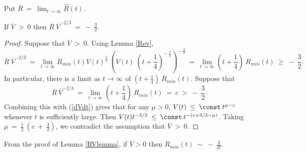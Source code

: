 Put $\overline{R} \: = \: \lim_{t \rightarrow \infty} \hat{R}(t)$.

\begin{lemma}
  \label{lem:kl-noncollapsed-pointed-limits-hyperbolic-noncollapsing-lemma-5}
 \label{RVlemma}
If $\overline{V} \: > \: 0$ then
$\overline{R} \: \overline{V}^{-2/3} \: = \: - \: \frac32$.
\end{lemma}
\begin{proof}
Suppose that $\overline{V} \: > \: 0$.
Using Lemma \ref{Rev},
\begin{equation}
\overline{R} \: \overline{V}^{-2/3}  \: = \:
\lim_{t \rightarrow \infty} R_{min}(t) V(t)^{\frac23} \:
\left( V(t) \: \left(t + \frac14 \right)^{- \: \frac32} \right)^{- \: \frac23} \: = \:
\lim_{t \rightarrow \infty} \left( t + \frac14 \right) \: R_{min}(t) \: \ge \: - \: \frac32.
\end{equation}
In particular, there is a limit as $t \rightarrow \infty$ of
$\left( t + \frac14 \right) \: R_{min}(t)$.
Suppose that
\begin{equation}
\overline{R} \: \overline{V}^{-2/3} \: = \:
\lim_{t \rightarrow \infty} \left( t + \frac14 \right) \: R_{min}(t) \: = \:
c \: >
\: - \: \frac32.
\end{equation}
Combining this with (\ref{dVdt}) gives that for any $\mu > 0$,
$V(t) \: \le \: \const \:
t^{\mu-c}$ whenever $t$ is sufficiently large. Then
$V(t) t^{-3/2} \: \le \: \const \: t^{-(c+3/2 - \mu)}$.
Taking $\mu \: = \: \frac12 \: (c \: + \: \frac32)$, we
contradict the assumption that $\overline{V} \: > \: 0$.
\end{proof}

From the proof of Lemma \ref{RVlemma},
if $\overline{V} > 0$ then $R_{min}(t) \: \sim \: - \: \frac{3}{2t}$.

